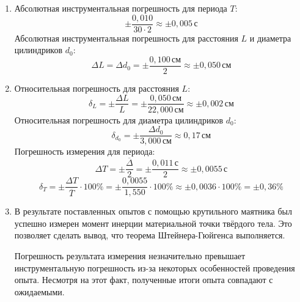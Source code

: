 \documentclass[otchet]{SCWorks}
\begin{document}
\begin{enumerate}[leftmargin=3.5cm]
    \item[\bf $\substack{\textbf{\normalsize Инструментальная}\\\textbf{\normalsize погрешность.}}$]
    Абсолютная инструментальная погрешность для периода $T$:
    \begin{equation*}
        \pm \frac{0,010}{30 \cdot 2} \approx \pm 0,005 \, \text{с}
    \end{equation*}
    Абсолютная инструментальная погрешность для расстояния $L$ и  диаметра цилиндриков $d_0$:
    \begin{equation*}
        \Delta L = \Delta d_0 = \pm \frac{0,100 \, \text{см}}{2} \approx \pm 0,050 \, \text{см}
    \end{equation*}
    \item[\bf $\substack{\textbf{\normalsize Погрешность}\\\textbf{\normalsize измерения.}}$]
    Относительная погрешность для расстояния $L$:
    \begin{equation*}
        \delta_L = \pm\frac{\Delta L}{L}=\pm\frac{0,050\,\text{см}}{22,000\,\text{см}}\approx\pm0,002\,\text{см}
    \end{equation*}
    Относительная погрешность для диаметра цилиндриков $d_0$:
    \begin{equation*}
        \delta_{d_0} = \pm \frac{\Delta d_0}{3,000\,\text{см}} \approx 0,17\,\text{см}
    \end{equation*}
    Погрешность измерения для периода:
    \begin{equation*}
        \Delta T = \pm \frac{\overline \Delta}{2} = \pm \frac{0,011\,\text{с}}{2} \approx \pm 0,0055 \, \text{с}
    \end{equation*}
    \begin{equation*}
        \delta_T = \pm \frac{\Delta T}{\overline T} \cdot 100\% = \pm \frac{0,0055}{1,550} \cdot 100\% \approx \pm 0,0036 \cdot 100\% = \pm 0,36\%
    \end{equation*}
    \item[\bf Вывод Данилы.]
    В результате поставленных опытов с помощью крутильного маятника был успешно измерен момент инерции материальной точки твёрдого тела. Это позволяет сделать вывод, что теорема Штейнера-Гюйгенса выполняется.
    
    Погрешность результата измерения незначительно превышает инструментальную погрешность из-за некоторых особенностей проведения опыта. Несмотря на этот факт, полученные итоги опыта совпадают с ожидаемыми.
    

\end{enumerate}
\end{document}

